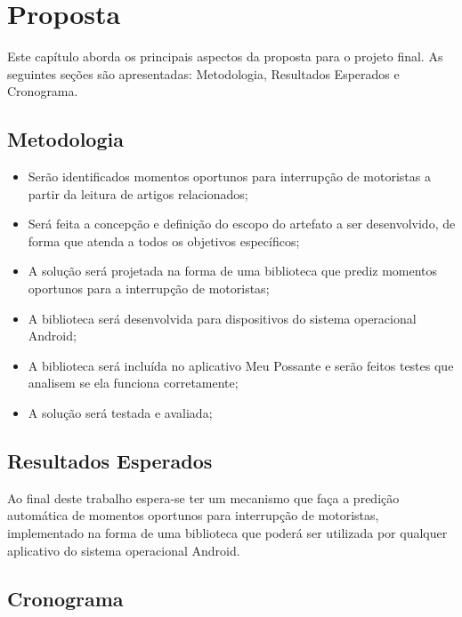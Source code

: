 \chapter{Proposta}
\label{proposta}
Este capítulo aborda os principais aspectos da proposta para o projeto final. As seguintes seções são apresentadas:
Metodologia, Resultados Esperados e Cronograma.

\section{Metodologia}
\label{metodologia}
\begin{itemize}
  \item Serão identificados momentos oportunos para interrupção de motoristas a partir da leitura de artigos
    relacionados;
  \item Será feita a concepção e definição do escopo do artefato a ser desenvolvido, de forma que atenda a
    todos os objetivos específicos;
  \item A solução será projetada na forma de uma biblioteca que prediz momentos oportunos para a interrupção
    de motoristas;
  \item A biblioteca será desenvolvida para dispositivos do sistema operacional Android;
  \item A biblioteca será incluída no aplicativo Meu Possante \cite{meupossante} e serão feitos testes que analisem se ela funciona
    corretamente;
  \item A solução será testada e avaliada;
\end{itemize}

\section{Resultados Esperados}
\label{resultados}

Ao final deste trabalho espera-se ter um mecanismo que faça a predição automática de momentos oportunos para
interrupção de motoristas, implementado na forma de uma biblioteca que poderá ser utilizada por qualquer aplicativo
do sistema operacional Android.

\clearpage

\section{Cronograma}
\label{cronograma}

